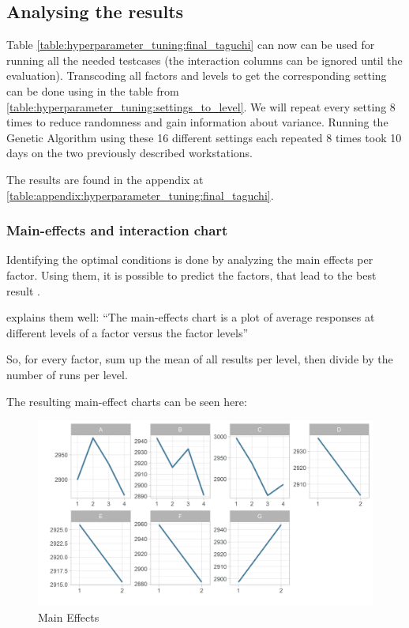 \subsection{Analysing the results}
\label{chap:hyperparameter_tuning:analysis_of_results}
Table \ref{table:hyperparameter_tuning:final_taguchi} can now can be used for running all the needed testcases (the interaction columns can be ignored until the evaluation). Transcoding all factors and levels to get the corresponding setting can be done using in the table from \ref{table:hyperparameter_tuning:settings_to_level}. We will repeat every setting 8 times to reduce randomness and gain information about variance. 
Running the Genetic Algorithm using these 16 different settings each repeated 8 times took 10 days on the two previously described workstations.

The results are found in the appendix at \ref{table:appendix:hyperparameter_tuning:final_taguchi}.

\subsubsection{Main-effects and interaction chart}
Identifying the optimal conditions is done by analyzing the main effects per factor. Using them, it is possible to predict the factors, that lead to the best result \cite{roy_primer_1990}.

\cite{yang_design_2009} explains them well: 
\enquote{The main-effects chart is a plot of average responses at different levels of a factor versus the factor levels}

So, for every factor, sum up the mean of all results per level, then divide by the number of runs per level.


The resulting main-effect charts can be seen here:
\begin{figure}[ht] 
	\label{figure:taguchi:main_effects}
	\includegraphics[width=1\linewidth]{simulations/taguchi/plots/main_effects}
	\caption{Main Effects}
\end{figure}


